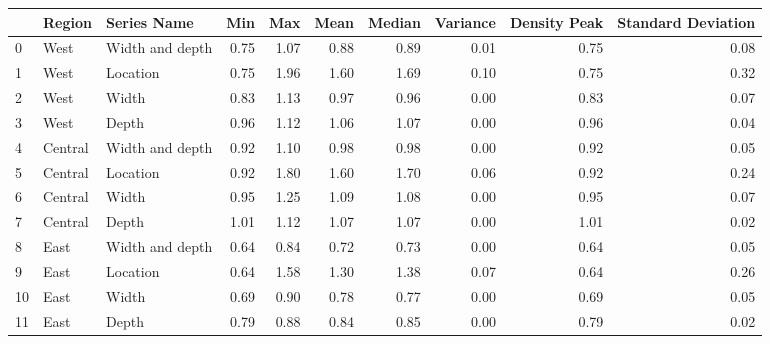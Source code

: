 \begin{tabular}{lllrrrrrrr}
\toprule
{} &   Region &      Series Name &   Min &   Max &  Mean &  Median &  Variance &  Density Peak &  Standard Deviation \\
\midrule
0  &     West &  Width and depth &  0.75 &  1.07 &  0.88 &    0.89 &      0.01 &          0.75 &                0.08 \\
1  &     West &         Location &  0.75 &  1.96 &  1.60 &    1.69 &      0.10 &          0.75 &                0.32 \\
2  &     West &            Width &  0.83 &  1.13 &  0.97 &    0.96 &      0.00 &          0.83 &                0.07 \\
3  &     West &            Depth &  0.96 &  1.12 &  1.06 &    1.07 &      0.00 &          0.96 &                0.04 \\
4  &  Central &  Width and depth &  0.92 &  1.10 &  0.98 &    0.98 &      0.00 &          0.92 &                0.05 \\
5  &  Central &         Location &  0.92 &  1.80 &  1.60 &    1.70 &      0.06 &          0.92 &                0.24 \\
6  &  Central &            Width &  0.95 &  1.25 &  1.09 &    1.08 &      0.00 &          0.95 &                0.07 \\
7  &  Central &            Depth &  1.01 &  1.12 &  1.07 &    1.07 &      0.00 &          1.01 &                0.02 \\
8  &     East &  Width and depth &  0.64 &  0.84 &  0.72 &    0.73 &      0.00 &          0.64 &                0.05 \\
9  &     East &         Location &  0.64 &  1.58 &  1.30 &    1.38 &      0.07 &          0.64 &                0.26 \\
10 &     East &            Width &  0.69 &  0.90 &  0.78 &    0.77 &      0.00 &          0.69 &                0.05 \\
11 &     East &            Depth &  0.79 &  0.88 &  0.84 &    0.85 &      0.00 &          0.79 &                0.02 \\
\bottomrule
\end{tabular}
